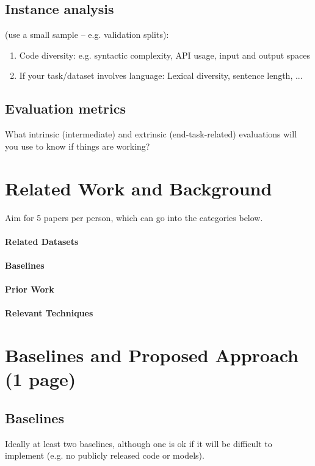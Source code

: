 \documentclass[11pt,a4paper]{article}
\begin{document}
\subsection{Instance analysis}
(use a small sample -- e.g. validation splits):
  \begin{enumerate}
    \item Code diversity: e.g. syntactic complexity, API usage, input and output spaces
    \item If your task/dataset involves language: Lexical diversity, sentence length, ...
  \end{enumerate}
\subsection{Evaluation metrics}
What intrinsic (intermediate) and extrinsic (end-task-related) evaluations will you use to know if things are working?

\clearpage

\section{Related Work and Background}
Aim for 5 papers per person, which can go into the categories below.
\paragraph{Related Datasets} 

\paragraph{Baselines}

\paragraph{Prior Work}

\paragraph{Relevant Techniques}


\clearpage
\section{Baselines and Proposed Approach (1 page)}

\subsection{Baselines}
Ideally at least two baselines, although one is ok if it will be difficult to implement (e.g. no publicly released code or models).
\end{document}
